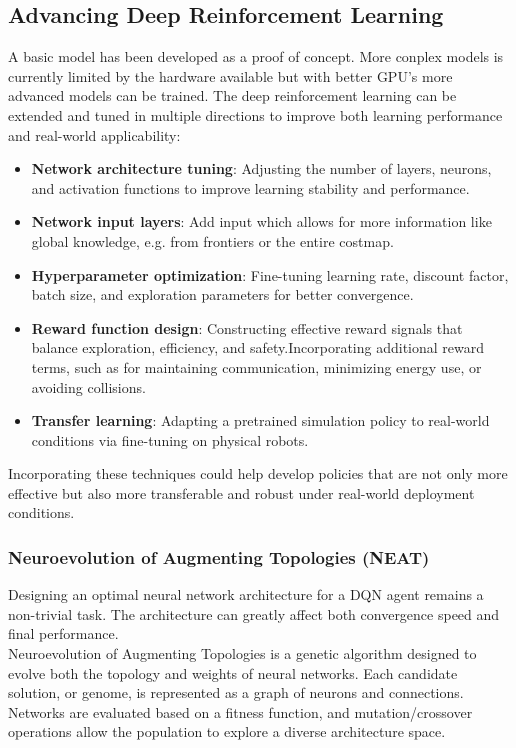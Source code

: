\subsection{Advancing Deep Reinforcement Learning}
A basic model has been developed as a proof of concept. {\color{red}More conplex models is currently limited by the hardware available but with better GPU's more advanced models can be trained.}
The deep reinforcement learning can be extended and tuned in multiple directions to improve both learning performance and real-world applicability:

\begin{itemize}
  \item \textbf{Network architecture tuning}: Adjusting the number of layers, neurons, and activation functions to improve learning stability and performance.
  \item \textbf{Network input layers}: Add input which allows for more information like global knowledge, e.g. from frontiers or the entire costmap.
  \item \textbf{Hyperparameter optimization}: Fine-tuning learning rate, discount factor, batch size, and exploration parameters for better convergence.
  \item \textbf{Reward function design}: Constructing effective reward signals that balance exploration, efficiency, and safety.Incorporating additional reward terms, such as for maintaining communication, minimizing energy use, or avoiding collisions.
  \item \textbf{Transfer learning}: Adapting a pretrained simulation policy to real-world conditions via fine-tuning on physical robots.
\end{itemize}

Incorporating these techniques could help develop policies that are not only more effective but also more transferable and robust under real-world deployment conditions.

\subsubsection{Neuroevolution of Augmenting Topologies (NEAT)}
Designing an optimal neural network architecture for a DQN agent remains a non-trivial task. The architecture can greatly affect both convergence speed and final performance.\\

Neuroevolution of Augmenting Topologies \cite{neat} is a genetic algorithm designed to evolve both the topology and weights of neural networks. Each candidate solution, or genome, is represented as a graph of neurons and connections. Networks are evaluated based on a fitness function, and mutation/crossover operations allow the population to explore a diverse architecture space.\\

